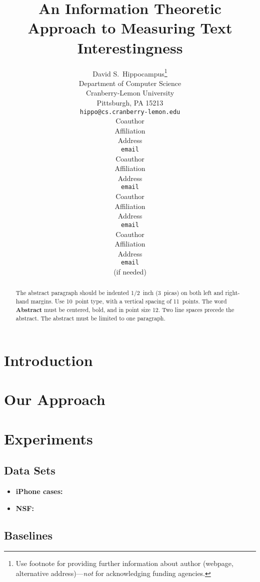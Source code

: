 \documentclass{article} %
\title{An Information Theoretic Approach to Measuring Text Interestingness}
\author{
David S.~Hippocampus\thanks{ Use footnote for providing further information
about author (webpage, alternative address)---\emph{not} for acknowledging
funding agencies.} \\
Department of Computer Science\\
Cranberry-Lemon University\\
Pittsburgh, PA 15213 \\
\texttt{hippo@cs.cranberry-lemon.edu} \\
\And
Coauthor \\
Affiliation \\
Address \\
\texttt{email} \\
\AND
Coauthor \\
Affiliation \\
Address \\
\texttt{email} \\
\And
Coauthor \\
Affiliation \\
Address \\
\texttt{email} \\
\And
Coauthor \\
Affiliation \\
Address \\
\texttt{email} \\
(if needed)\\
}
\begin{document}
\maketitle

\begin{abstract}
The abstract paragraph should be indented 1/2~inch (3~picas) on both left and
right-hand margins. Use 10~point type, with a vertical spacing of 11~points.
The word \textbf{Abstract} must be centered, bold, and in point size 12. Two
line spaces precede the abstract. The abstract must be limited to one
paragraph.
\end{abstract}



\section{Introduction}
\label{sec:introduction}


\section{Our Approach}
\label{sec:our-approach}



\section{Experiments}
\label{sec:experiments}

\subsection{Data Sets}
\label{sec:data-sets}
\begin{itemize}
\item {\bf iPhone cases:}
\item{\bf NSF:}
\end{itemize}

\subsection{Baselines}
\label{sec:baselines}
\end{document}

